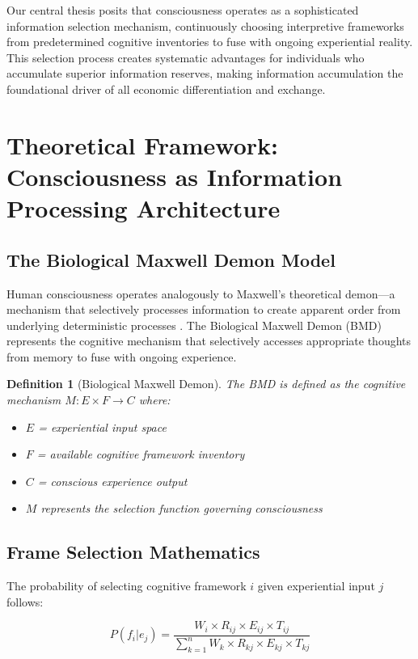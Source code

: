 \documentclass[12pt,a4paper]{article}
\newtheorem{definition}[theorem]{Definition}
\begin{document}
Our central thesis posits that consciousness operates as a sophisticated information selection mechanism, continuously choosing interpretive frameworks from predetermined cognitive inventories to fuse with ongoing experiential reality. This selection process creates systematic advantages for individuals who accumulate superior information reserves, making information accumulation the foundational driver of all economic differentiation and exchange.

\section{Theoretical Framework: Consciousness as Information Processing Architecture}

\subsection{The Biological Maxwell Demon Model}

Human consciousness operates analogously to Maxwell's theoretical demon—a mechanism that selectively processes information to create apparent order from underlying deterministic processes \cite{maxwell1867}. The Biological Maxwell Demon (BMD) represents the cognitive mechanism that selectively accesses appropriate thoughts from memory to fuse with ongoing experience.

\begin{definition}[Biological Maxwell Demon]
The BMD is defined as the cognitive mechanism $M: E \times F \rightarrow C$ where:
\begin{itemize}
\item $E$ = experiential input space
\item $F$ = available cognitive framework inventory  
\item $C$ = conscious experience output
\item $M$ represents the selection function governing consciousness
\end{itemize}
\end{definition}

\subsection{Frame Selection Mathematics}

The probability of selecting cognitive framework $i$ given experiential input $j$ follows:

\begin{equation}
P(f_i | e_j) = \frac{W_i \times R_{ij} \times E_{ij} \times T_{ij}}{\sum_{k=1}^{n} W_k \times R_{kj} \times E_{kj} \times T_{kj}}
\end{equation}
\end{document}
